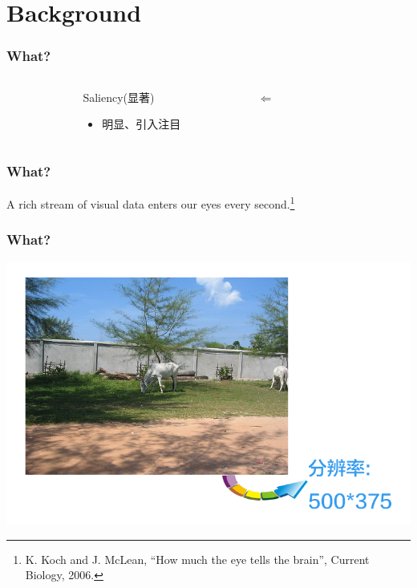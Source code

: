 \documentclass[notheorems,serif,table,compress]{beamer}  %
\begin{document}
\section{Background}



\begin{frame}[fragile]
\frametitle{What?}
\begin{columns}
\begin{column}{\leftmargini}
\end{column}
\begin{column}{0.5\linewidth}
\huge{Saliency(显著)}

\begin{itemize}
\item \large{明显、引入注目}
\end{itemize}
\end{column}
\pause
\begin{column}{0.16\linewidth}
\huge $\Longleftarrow$ 
\end{column}
\pause
\begin{column}{0.3\linewidth}
 \centering{\huge \color{blue}{Visual Attention}}
\end{column}
\end{columns}\vspace{1ex}
\end{frame}


\begin{frame}
\frametitle{What?}
  A rich stream of visual data enters our eyes every second.\footnote{K. Koch and J. McLean, ``How much the eye tells the brain'', Current Biology, 2006. }\newline
  
  \pause
  \centering{\Huge \color{blue}{$10^8 \sim 10^9 bits$}}
\end{frame}
  
  
\begin{frame}
  \frametitle{What?}
  \begin{center}
  \includegraphics[width=0.85\linewidth]{tuxiang.png}
  \end{center}
  
  \pause
\end{frame}
\end{document}

